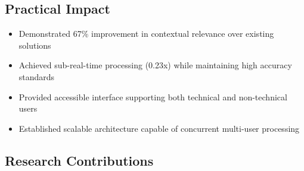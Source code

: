 \documentclass{bscs}
\begin{document}
\subsection{Practical Impact}

\begin{itemize}
\item Demonstrated 67\% improvement in contextual relevance over existing solutions
\item Achieved sub-real-time processing (0.23x) while maintaining high accuracy standards
\item Provided accessible interface supporting both technical and non-technical users
\item Established scalable architecture capable of concurrent multi-user processing
\end{itemize}

\subsection{Research Contributions}
\end{document}
